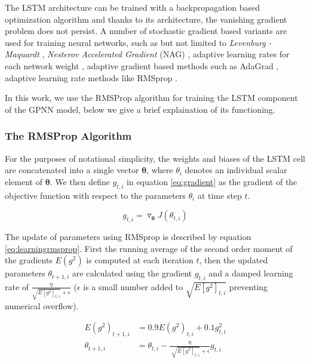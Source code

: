 The LSTM architecture can be trained with a backpropagation based optimization algorithm and thanks 
to its architecture, the vanishing gradient problem does not persist. A number of stochastic 
gradient based variants are used for training neural networks, such as but not limited to 
\emph{Levenburg - Maquardt} \citep{marquardt1963algorithm}, \emph{Nesterov Accelerated Gradient} (NAG) 
\citep{nesterov1983method}, adaptive learning rates for each network weight \citep{SilvaAlmeida}, adaptive gradient based methods such as AdaGrad \citep{duchi2011adaptive}, adaptive learning rate methods like RMSprop \citep{tieleman2012lecture}. 

In this work, we use the RMSProp algorithm for training the LSTM component of the GPNN model, 
below we give a brief explaination of its functioning.

\subsubsection*{The RMSProp Algorithm}

For the purposes of notational simplicity, the weights and biases of the LSTM cell are 
concatenated into a single vector $\mathbf{\theta}$, where $\theta_i$ denotes an individual 
scalar element of $\mathbf{\theta}$. We then define $g_{t,i}$ in equation \ref{eq:gradient} as the 
gradient of the objective function with respect to the parameters $\theta_{i}$ at time step $t$. 

\begin{equation}\label{eq:gradient}
 g_{t,i} = \triangledown_{ \mathbf{\theta} } J \left(  \theta_{t,i} \right)
\end{equation}

The update of parameters using RMSprop is described by equation \ref{eq:learningrmsprop}. First the running average 
of the second order moment of the gradients $  E \left( g^{2} \right)  $ is computed at each iteration $t$, then 
the updated parameters $\theta_{t+1,i}$ are calculated using the gradient $g_{t,i}$ and a damped learning rate of 
$\frac{\eta}{\sqrt{E \left[ g^{2} \right]_{t,i}} + \epsilon }$ ($\epsilon$ is a small number added to 
$\sqrt{E \left[ g^{2} \right]_{t,i}}$ preventing numerical overflow).


\begin{align}\label{eq:learningrmsprop}
 E \left( g^{2} \right)_{t+1,i} &= 0.9 E \left( g^{2} \right)_{t,i} + 0.1 g_{t,i}^{2}  \\ 
 \theta_{t+1,i} &= \theta_{t,i} - \frac{ \eta }{\sqrt[]{E \left[ g^{2} \right]_{t,i}} + \epsilon } g_{t,i}
\end{align}

